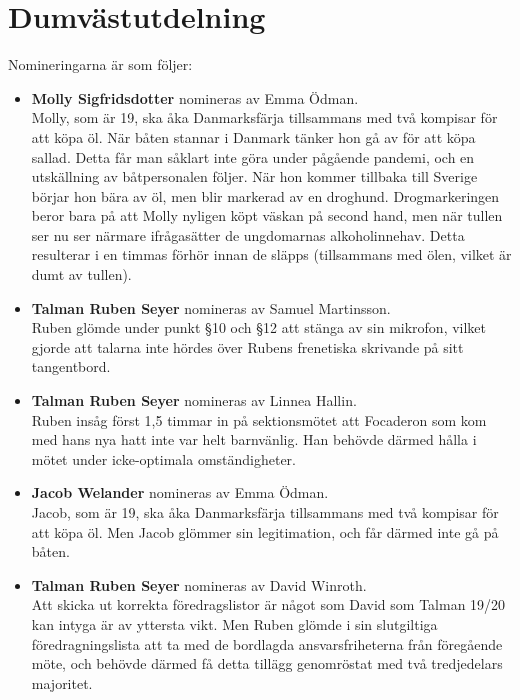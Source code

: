 \documentclass[hidelinks]{sektionsmote} %
\begin{document}
\section{Dumvästutdelning}
Nomineringarna är som följer:
\begin{itemize}
  \item \textbf{Molly Sigfridsdotter} nomineras av Emma Ödman.\\
  Molly, som är 19, ska åka Danmarksfärja tillsammans med två kompisar för att köpa öl.
  När båten stannar i Danmark tänker hon gå av för att köpa sallad.
  Detta får man såklart inte göra under pågående pandemi, och en utskällning av båtpersonalen följer.
  När hon kommer tillbaka till Sverige börjar hon bära av öl, men blir markerad av en droghund.
  Drogmarkeringen beror bara på att Molly nyligen köpt väskan på second hand, men när tullen ser nu ser närmare ifrågasätter de ungdomarnas alkoholinnehav.
  Detta resulterar i en timmas förhör innan de släpps (tillsammans med ölen, vilket är dumt av tullen).

  \item \textbf{Talman Ruben Seyer} nomineras av Samuel Martinsson.\\
  Ruben glömde under punkt §10 och §12 att stänga av sin mikrofon, vilket gjorde att talarna inte hördes över Rubens frenetiska skrivande på sitt tangentbord.

  \item \textbf{Talman Ruben Seyer} nomineras av Linnea Hallin.\\
  Ruben insåg först 1,5 timmar in på sektionsmötet att Focaderon som kom med hans nya hatt inte var helt barnvänlig.
  Han behövde därmed hålla i mötet under icke-optimala omständigheter.

  \item \textbf{Jacob Welander} nomineras av Emma Ödman.\\
  Jacob, som är 19, ska åka Danmarksfärja tillsammans med två kompisar för att köpa öl.
  Men Jacob glömmer sin legitimation, och får därmed inte gå på båten.

  \item \textbf{Talman Ruben Seyer} nomineras av David Winroth.\\
  Att skicka ut korrekta föredragslistor är något som David som Talman 19/20 kan intyga är av yttersta vikt.
  Men Ruben glömde i sin slutgiltiga föredragningslista att ta med de bordlagda ansvarsfriheterna från föregående möte, och behövde därmed få detta tillägg genomröstat med två tredjedelars majoritet.


\end{itemize}
\end{document}
